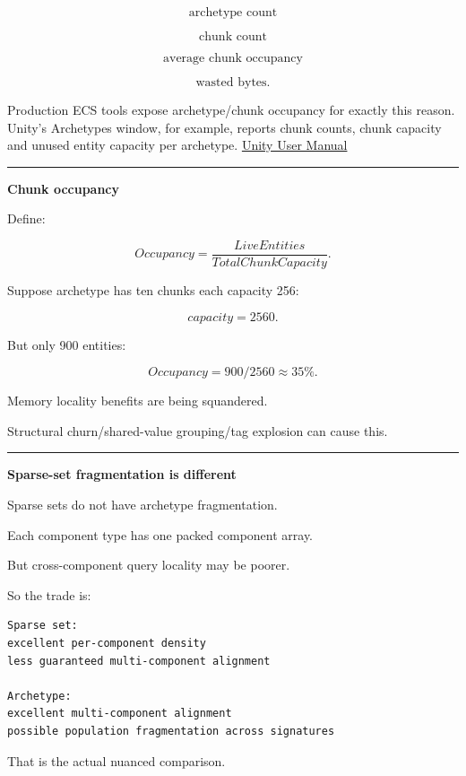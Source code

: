 \[
\text{archetype count}
\]

\[
\text{chunk count}
\]

\[
\text{average chunk occupancy}
\]

\[
\text{wasted bytes}.
\]

Production ECS tools expose archetype/chunk occupancy for exactly this reason. Unity's Archetypes window, for example, reports chunk counts, chunk capacity and unused entity capacity per archetype. \href{https://docs.unity.cn/Packages/com.unity.entities\%401.0/manual/editor-archetypes-window.html?utm_source=chatgpt.com}{Unity User Manual}

\begin{center}\rule{0.5\linewidth}{0.5pt}\end{center}

\textbf{Chunk occupancy}

Define:

\[
Occupancy=
\frac{LiveEntities}
{TotalChunkCapacity}.
\]

Suppose archetype has ten chunks each capacity 256:

\[
capacity=2560.
\]

But only 900 entities:

\[
Occupancy=
900/2560
\approx35\%.
\]

Memory locality benefits are being squandered.

Structural churn/shared-value grouping/tag explosion can cause this.

\begin{center}\rule{0.5\linewidth}{0.5pt}\end{center}

\textbf{Sparse-set fragmentation is different}

Sparse sets do not have archetype fragmentation.

Each component type has one packed component array.

But cross-component query locality may be poorer.

So the trade is:

\begin{verbatim}
Sparse set:
excellent per-component density
less guaranteed multi-component alignment

Archetype:
excellent multi-component alignment
possible population fragmentation across signatures
\end{verbatim}

That is the actual nuanced comparison.

